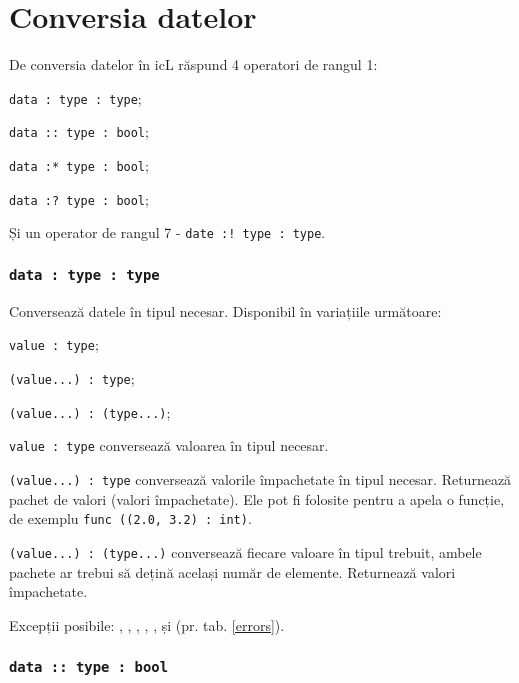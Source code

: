 \section{Conversia datelor}

De conversia datelor în icL răspund 4 operatori de rangul 1:
\begin{icItems}
	\item \texttt{data : type : type};
	\item \texttt{data :: type : bool};
	\item \texttt{data :* type : bool};
	\item \texttt{data :? type : bool};
\end{icItems}

Și un operator de rangul 7 - \texttt{date :! type : type}.

\subsubsection{\texttt{data : type : type}}

Conversează datele în tipul necesar. Disponibil în variațiile următoare:
\begin{icItems}
	\item \texttt{value : type};
	\item \texttt{(value...) : type};
	\item \texttt{(value...) : (type...)};
\end{icItems}

\texttt{value : type} conversează valoarea în tipul necesar.

\texttt{(value...) : type} conversează valorile împachetate în tipul necesar. Returnează pachet de valori (valori împachetate). Ele pot fi folosite pentru a apela o funcție, de exemplu \texttt{func ((2.0, 3.2) : int)}.

\texttt{(value...) : (type...)} conversează fiecare valoare în tipul trebuit, ambele pachete ar trebui să dețină același număr de elemente. Returnează valori împachetate.

Excepții posibile: , , , , ,  și  (pr. tab. \ref{errors}).

\subsubsection{\texttt{data :: type : bool}}

